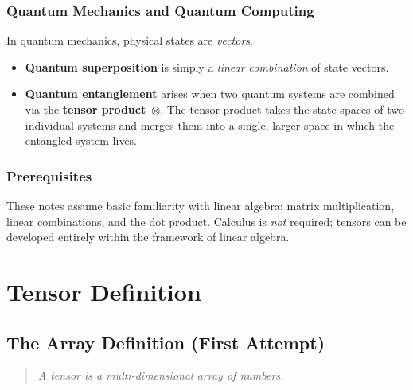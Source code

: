 \documentclass[12pt, a4paper]{report}
\theoremstyle{definition}
\theoremstyle{plain}
\theoremstyle{remark}
\begin{document}
\subsection*{Quantum Mechanics and Quantum Computing}

In quantum mechanics, physical states are \emph{vectors}.
\begin{itemize}[nosep]
    \item \textbf{Quantum superposition} is simply a \emph{linear combination} of
          state vectors.
    \item \textbf{Quantum entanglement} arises when two quantum systems are combined
          via the \textbf{tensor product}~$\otimes$.  The tensor product takes the
          state spaces of two individual systems and merges them into a single,
          larger space in which the entangled system lives.
\end{itemize}

\subsection*{Prerequisites}

These notes assume basic familiarity with linear algebra: matrix multiplication,
linear combinations, and the dot product.  Calculus is \emph{not} required; tensors
can be developed entirely within the framework of linear algebra.

\chapter{Tensor Definition}\label{ch:tensor-def}

\section{The Array Definition (First Attempt)}

\begin{quote}
    \emph{A tensor is a multi-dimensional array of numbers.}
\end{quote}
\end{document}
